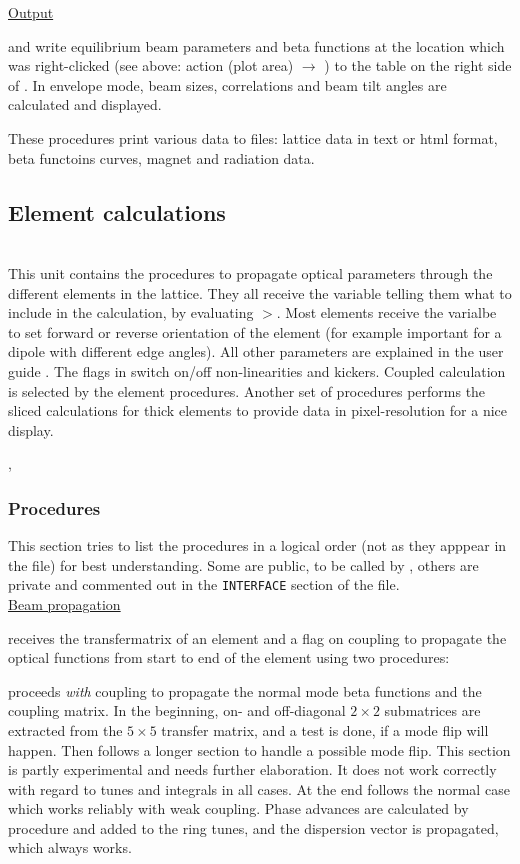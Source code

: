 \documentclass[12pt]{article}
\newcommand\code[1]{{\tt #1}}
\newcommand{\ofldx}[1]{\colorbox{black!15}{(#1)}}
\newcommand\guico[1]{{\color{blue}\code{#1}}}
\newcommand{\unico}[1]{{\color{burntorange}\code{#1}}}
\newcommand{\evcodx}[2]{\ofldx{#1} $\rightarrow$ \guico{#2}}
\newcommand{\prcod}[2]{\opauni{#1}$>$\unico{#2}}
\newcommand{\opagui}[1]{\colorbox{blue!20}{{\color{black}\code{#1}}}}
\newcommand{\ogui}[1]{\hyperref[#1]{\opagui{#1}}}
\newcommand{\opauni}[1]{\colorbox{orange!30}{{\color{black}\code{#1}}}}
\newcommand{\ounih}[2]{\subsection{\label{#2}#1}{\Huge\opauni{#2}}\\}
\newcommand{\ouni}[1]{\hyperref[#1]{\opauni{#1}}}
\newcommand{\uses}[1]{\flushleft {\bf Uses:} #1}
\newcommand{\desc}[1]{#1}
\newcommand{\todo}[1]{{\color{red} #1}}
\begin{document}
{\underline{Output}

\unico{FillBeamTab} and \unico{FillBetaTab} write equilibrium beam parameters and beta functions at the location which was right-clicked (see above: \ogui{opalinop} action \evcodx{plot area}{pwMouseDown}) to the table on the right side of \ogui{opalinop}. In envelope mode, beam sizes, correlations and beam tilt angles are calculated and displayed. 

\unico{Print\dots} These procedures print various data to files: lattice data in text or html format, beta functoins curves, magnet and radiation data.
}

\ounih{Element calculations}{elemlib} 

\desc{This unit contains the procedures to propagate optical parameters through the different elements in the lattice. They all receive the variable \unico{mode} telling them what to include in the calculation, by evaluating \prcod{globlib}{switch}. Most elements receive the varialbe \unico{idir} to set forward or reverse orientation of the element (for example important for a dipole with different edge angles). All other parameters are explained in the user guide \cite{userguide}. 
The flags \unico{UseSext,UsePulsed} in \ouni{globlib} switch on/off non-linearities and kickers. Coupled calculation is selected by the element procedures. Another set of procedures performs the sliced calculations for thick elements to provide data in pixel-resolution for a nice display. 
}

\uses{\ouni{globlib}, \ouni{mathlib}}

\subsubsection*{Procedures}

This section tries to list the procedures in a logical order (not as they apppear in the file) for best understanding. Some are public, to be called by \ouni{linoplib}, others are private and commented out in the \code{INTERFACE} section of the file.\\

\underline{Beam propagation}

\unico{Propagate} receives the transfermatrix of an element and a flag on coupling to propagate the optical functions from start to end of the element using two procedures:

\unico{MCC\_prop} proceeds {\em with} coupling to propagate the normal mode beta functions and the coupling matrix. In the beginning, on- and off-diagonal $2\times 2$ submatrices are extracted from the $5\times 5$ transfer matrix, and a test is done, if a mode flip will happen. Then follows a longer section to handle a possible mode flip. \todo{This section is partly experimental and needs further elaboration. It does not work correctly with regard to tunes and integrals in all cases.} At the end follows the normal case which works reliably with weak coupling. Phase advances are calculated by procedure \unico{PhaseAdvance} and added to the ring tunes, and the dispersion vector is propagated, which always works.
\end{document}
